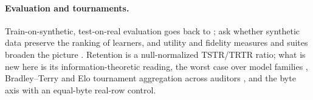 \paragraph{Evaluation and tournaments.} Train-on-synthetic, test-on-real evaluation goes back to
\citet{esteban2017rcgan}; \citet{jordon2018measuring} ask whether synthetic data preserve the ranking of
learners, and utility and fidelity measures and suites broaden the picture
\citep{snoke2018utility,alaa2022faithful,qian2023synthcity,erickson2026tabarena}. Retention is a
null-normalized TSTR/TRTR ratio; what is new here is its information-theoretic reading, the worst case
over model families \citep{prokhorenkova2018catboost,chen2016xgboost,ke2017lightgbm}, Bradley--Terry
and Elo tournament aggregation across auditors \citep{bradley1952rank,hunter2004mm,elo1978rating}, and
the byte axis with an equal-byte real-row control.

